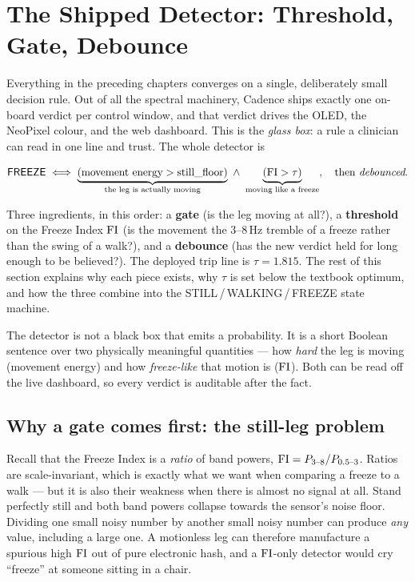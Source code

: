 \section{The Shipped Detector: Threshold, Gate, Debounce}
\label{sec:detector}

Everything in the preceding chapters converges on a single, deliberately small
decision rule. Out of all the spectral machinery, Cadence ships exactly one
on-board verdict per control window, and that verdict drives the OLED, the
NeoPixel colour, and the web dashboard. This is the \emph{glass box}: a rule a
clinician can read in one line and trust. The whole detector is

\begin{equation}
\textsf{FREEZE} \iff
\underbrace{(\text{movement energy} > \text{still\_floor})}_{\text{the leg is actually moving}}
\ \wedge\
\underbrace{(\mathrm{FI} > \tau)}_{\text{moving like a freeze}},
\quad\text{then \emph{debounced}.}
\label{eq:rule}
\end{equation}

\noindent Three ingredients, in this order: a \textbf{gate} (is the leg moving at
all?), a \textbf{threshold} on the Freeze Index $\mathrm{FI}$ (is the movement the
3--8\,Hz tremble of a freeze rather than the swing of a walk?), and a
\textbf{debounce} (has the new verdict held for long enough to be believed?). The
deployed trip line is $\tau = 1.815$. The rest of this section explains why each
piece exists, why $\tau$ is set below the textbook optimum, and how the three
combine into the STILL\,/\,WALKING\,/\,FREEZE state machine.

\begin{keyidea}
The detector is not a black box that emits a probability. It is a short Boolean
sentence over two physically meaningful quantities --- how \emph{hard} the leg is
moving (movement energy) and how \emph{freeze-like} that motion is ($\mathrm{FI}$). Both
can be read off the live dashboard, so every verdict is auditable after the fact.
\end{keyidea}

\subsection{Why a gate comes first: the still-leg problem}

Recall that the Freeze Index is a \emph{ratio} of band powers,
$\mathrm{FI} = P_{3\text{--}8} / P_{0.5\text{--}3}$. Ratios are scale-invariant, which is
exactly what we want when comparing a freeze to a walk --- but it is also their
weakness when there is almost no signal at all. Stand perfectly still and both
band powers collapse towards the sensor's noise floor. Dividing one small noisy
number by another small noisy number can produce \emph{any} value, including a
large one. A motionless leg can therefore manufacture a spurious high $\mathrm{FI}$ out of
pure electronic hash, and a $\mathrm{FI}$-only detector would cry ``freeze'' at someone
sitting in a chair.

